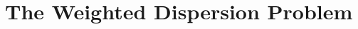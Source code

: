 \documentclass[a4paper,UKenglish]{lipics-v2016}
\theoremstyle{plain}
\begin{document}
%
%

\section{The Weighted Dispersion Problem}\label{section:weighted}

%
\end{document}
